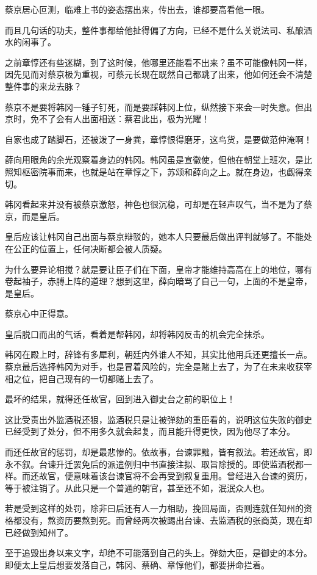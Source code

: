 蔡京居心叵测，临难上书的姿态摆出来，传出去，谁都要高看他一眼。

而且几句话的功夫，整件事都给他扯得偏了方向，已经不是什么关说法司、私酿酒水的闲事了。

之前章惇还有些迷糊，到了这时候，他哪里还能看不出来？虽不可能像韩冈一样，因先见而对蔡京极为重视，可蔡元长现在既然自己都跳了出来，他如何还会不清楚整件事的来龙去脉？

蔡京不是要将韩冈一锤子钉死，而是要踩韩冈上位，纵然接下来会一时失意。但出京时，免不了会有人出面相送：蔡君此出，极为光耀！

自家也成了踏脚石，还被泼了一身粪，章惇恨得磨牙，这鸟货，是要做范仲淹啊！

薛向用眼角的余光观察着身边的韩冈。韩冈虽是宣徽使，但他在朝堂上班次，是比照知枢密院事而来，也就是站在章惇之下，苏颂和薛向之上。就在身边，也觑得亲切。

韩冈看起来并没有被蔡京激怒，神色也很沉稳，可却是在轻声叹气，当不是为了蔡京，而是皇后。

皇后应该让韩冈自己出面与蔡京辩驳的，她本人只要最后做出评判就够了。不能处在公正的位置上，任何决断都会被人质疑。

为什么要异论相搅？就是要让臣子们在下面，皇帝才能维持高高在上的地位，哪有卷起袖子，赤膊上阵的道理？想到这里，薛向暗骂了自己一句，上面的不是皇帝，是皇后。

蔡京心中正得意。

皇后脱口而出的气话，看着是帮韩冈，却将韩冈反击的机会完全抹杀。

韩冈在殿上时，辞锋有多犀利，朝廷内外谁人不知，其实比他用兵还更擅长一点。蔡京最后选择韩冈为对手，也是冒着风险的，完全是赌上去了，为了在未来收获宰相之位，把自己现有的一切都赌上去了。

最坏的结果，就得还任故官，回到进入御史台之前的职位上！

这比受责出外监酒税还狠，监酒税只是让被弹劾的重臣看的，说明这位失败的御史已经受到了处分，但不用多久就会起复，而且能升得更快，因为他尽了本分。

而还任故官的惩罚，却是最悲惨的。依故事，台谏罪黜，皆有叙法。若还故官，即永不叙。台谏升迁罢免后的派遣例归中书直接注拟、取旨除授的。即使监酒税都一样。而还故官，便意味着该台谏官将不会再受到叙复重用。曾经进入台谏的资历，等于被注销了。从此只是一个普通的朝官，甚至还不如，泯泯众人也。

若是受到这样的处罚，除非曰后还有人一力相助，挽回局面，否则连就任知州的资格都没有，熬资历要熬到死。而曾经两次被踢出台谏、去监酒税的张商英，现在却已经做到知州了。

至于追毁出身以来文字，却绝不可能落到自己的头上。弹劾大臣，是御史的本分。即便太上皇后想要发落自己，韩冈、蔡确、章惇他们，都要拼命拦着。

